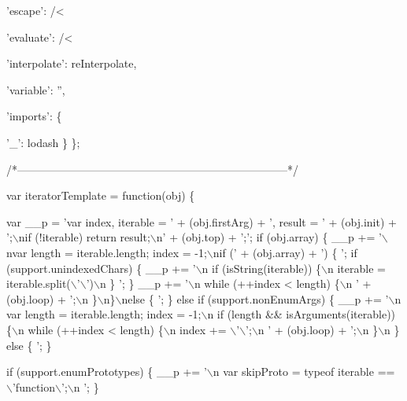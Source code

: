 \begin{DoxyCodeInclude}
      \textcolor{stringliteral}{'escape'}: /<%

      \textcolor{stringliteral}{'evaluate'}: /<%

      \textcolor{stringliteral}{'interpolate'}: reInterpolate,

      \textcolor{stringliteral}{'variable'}: \textcolor{stringliteral}{''},

      \textcolor{stringliteral}{'imports'}: \{

        \textcolor{charliteral}{'\_'}: lodash
      \}
    \};

    \textcolor{comment}{/*--------------------------------------------------------------------------*/}

    var iteratorTemplate = \textcolor{keyword}{function}(obj) \{

      var \_\_p = \textcolor{stringliteral}{'var index, iterable = '} +
      (obj.firstArg) +
      \textcolor{stringliteral}{', result = '} +
      (obj.init) +
      \textcolor{stringliteral}{';\(\backslash\)nif (!iterable) return result;\(\backslash\)n'} +
      (obj.top) +
      \textcolor{charliteral}{';'};
       \textcolor{keywordflow}{if} (obj.array) \{
      \_\_p += \textcolor{stringliteral}{'\(\backslash\)nvar length = iterable.length; index = -1;\(\backslash\)nif ('} +
      (obj.array) +
      \textcolor{stringliteral}{') \{  '};
       \textcolor{keywordflow}{if} (support.unindexedChars) \{
      \_\_p += \textcolor{stringliteral}{'\(\backslash\)n  if (isString(iterable)) \{\(\backslash\)n    iterable = iterable.split(\(\backslash\)'\(\backslash\)')\(\backslash\)n  \}  '};
       \}
      \_\_p += \textcolor{stringliteral}{'\(\backslash\)n  while (++index < length) \{\(\backslash\)n    '} +
      (obj.loop) +
      \textcolor{stringliteral}{';\(\backslash\)n  \}\(\backslash\)n\}\(\backslash\)nelse \{  '};
       \} \textcolor{keywordflow}{else} \textcolor{keywordflow}{if} (support.nonEnumArgs) \{
      \_\_p += \textcolor{stringliteral}{'\(\backslash\)n  var length = iterable.length; index = -1;\(\backslash\)n  if (length && isArguments(iterable)) \{\(\backslash\)n   
       while (++index < length) \{\(\backslash\)n      index += \(\backslash\)'\(\backslash\)';\(\backslash\)n      '} +
      (obj.loop) +
      \textcolor{stringliteral}{';\(\backslash\)n    \}\(\backslash\)n  \} else \{  '};
       \}

       \textcolor{keywordflow}{if} (support.enumPrototypes) \{
      \_\_p += \textcolor{stringliteral}{'\(\backslash\)n  var skipProto = typeof iterable == \(\backslash\)'function\(\backslash\)';\(\backslash\)n  '};
       \}


\end{DoxyCodeInclude}
